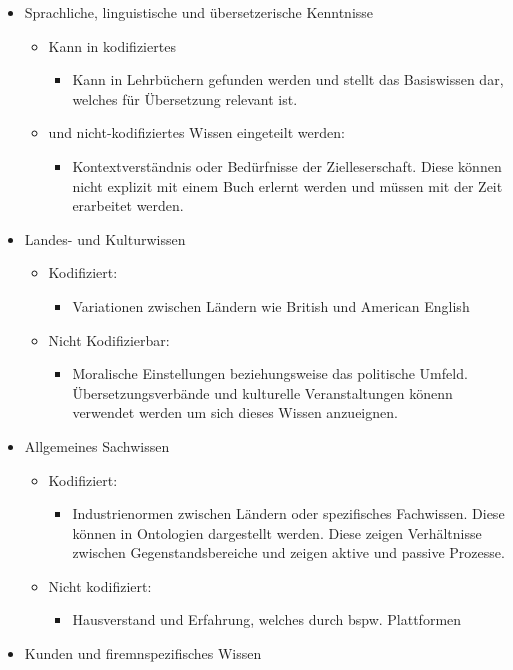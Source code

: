 \documentclass{article}
\begin{document}
	\begin{itemize}
		\item{Sprachliche, linguistische und übersetzerische Kenntnisse}
		\begin{itemize}
			\item{Kann in kodifiziertes}
			\begin{itemize}
				\item{Kann in Lehrbüchern gefunden werden und stellt das Basiswissen dar, welches für Übersetzung relevant ist.}
			\end{itemize}
			\item{und nicht-kodifiziertes Wissen eingeteilt werden:}
			\begin{itemize}
				\item{Kontextverständnis oder Bedürfnisse der Zielleserschaft. Diese können nicht explizit mit einem Buch erlernt werden und müssen mit der Zeit erarbeitet werden.}
			\end{itemize}
		\end{itemize}
		\item{Landes- und Kulturwissen}
		\begin{itemize}
			\item{Kodifiziert:}
			\begin{itemize}
				\item{Variationen zwischen Ländern wie British und American English}
			\end{itemize}
			\item{Nicht Kodifizierbar:}
			\begin{itemize}
				\item{Moralische Einstellungen beziehungsweise das politische Umfeld. Übersetzungsverbände und kulturelle Veranstaltungen könenn verwendet werden um sich dieses Wissen anzueignen.}
			\end{itemize}
		\end{itemize}
		\item{Allgemeines Sachwissen}
		\begin{itemize}
			\item{Kodifiziert:}
			\begin{itemize}
				\item{Industrienormen zwischen Ländern oder spezifisches Fachwissen. Diese können in Ontologien dargestellt werden. Diese zeigen Verhältnisse zwischen Gegenstandsbereiche und zeigen aktive und passive Prozesse.}
			\end{itemize}
			\item{Nicht kodifiziert:}
			\begin{itemize}
				\item{Hausverstand und Erfahrung, welches durch bspw. Plattformen}
			\end{itemize}
		\end{itemize}
		\item{Kunden und firemnspezifisches Wissen}
	\end{itemize}
\end{document}
